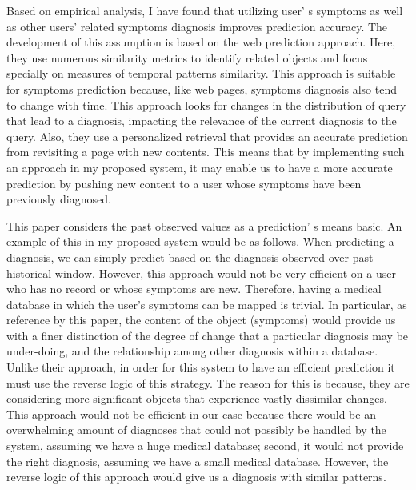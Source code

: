 \documentclass{sig-alternate}
\begin{document}
	
Based on empirical analysis, I have found that utilizing user' s symptoms as well as other users' related symptoms diagnosis improves prediction accuracy. The development of this assumption is based on the web prediction approach. Here, they use numerous similarity metrics to identify related objects and focus specially on measures of temporal patterns similarity. This approach is suitable for symptoms prediction because, like web pages, symptoms diagnosis also tend to change with time. This approach looks for changes in the distribution of query that lead to a diagnosis, impacting the relevance of the current diagnosis to the query. Also, they use a personalized retrieval that provides an accurate prediction from revisiting a page with new contents. This means that by implementing such an approach in my proposed system, it may enable us to have a more accurate prediction by pushing new content to a user whose symptoms have been previously diagnosed.\newline

This paper considers the past observed values as a prediction' s means basic. An example of this in my proposed system would be as follows. When predicting a diagnosis, we can simply predict based on the diagnosis observed over past historical window. However, this approach would not be very efficient on a user who has no record or whose symptoms are new. Therefore, having a medical database in which the user's symptoms can be mapped is trivial. In particular, as reference by this paper, the content of the object (symptoms) would provide us with a finer distinction of the degree of change that a particular diagnosis may be under-doing, and the relationship among other diagnosis within a database. Unlike their approach, in order for this system to have an efficient prediction it must use the reverse logic of this strategy. The reason for this is because, they are considering more significant objects that experience vastly dissimilar changes. This approach would not be efficient in our case because there would be an overwhelming amount of diagnoses that could not possibly be handled by the system, assuming we have a huge medical database; second, it would not provide the right diagnosis, assuming we have a small medical database. However, the reverse logic of this approach would give us a diagnosis with similar patterns.\newline
\end{document}
